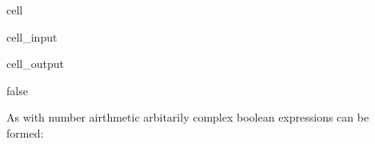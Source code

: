 \documentclass[a4paper,10pt,english]{jupyterBook}
\begin{document}
\begin{sphinxuseclass}{cell}\begin{sphinxVerbatimInput}

\begin{sphinxuseclass}{cell_input}
\begin{sphinxVerbatim}[commandchars=\\\{\}]
\end{sphinxVerbatim}

\end{sphinxuseclass}\end{sphinxVerbatimInput}
\begin{sphinxVerbatimOutput}

\begin{sphinxuseclass}{cell_output}
\begin{sphinxVerbatim}[commandchars=\\\{\}]
false
\end{sphinxVerbatim}

\end{sphinxuseclass}\end{sphinxVerbatimOutput}

\end{sphinxuseclass}
\sphinxAtStartPar
As with number airthmetic arbitarily complex boolean expressions can be formed:
\end{document}
